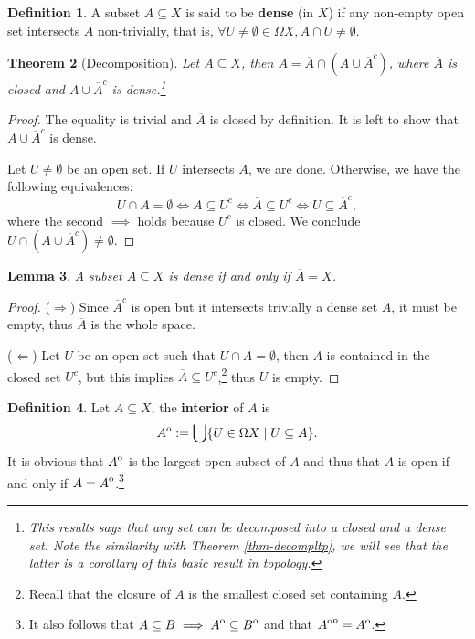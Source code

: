\documentclass{tufte-handout} %
\newtheorem{thm}{Theorem}
\newtheorem{lem}[thm]{Lemma}
\theoremstyle{definition}
\newtheorem{defn}[thm]{Definition}
\theoremstyle{remark}
\newcommand{\0}{\textsf{0}}
\newcommand{\1}{\textsf{1}}
\newcommand{\interior}[1]{
	{\kern0pt#1}^{\mathrm{o}}
}
\begin{document}
\begin{defn}
	A subset $A\subseteq X$ is said to be \textbf{dense} (in $X$) if any non-empty open set intersects $A$ non-trivially, that is, $\forall U \neq \emptyset \in \Omega X, A \cap U \neq \emptyset$.
\end{defn}
\begin{thm}[Decomposition]\label{thm-decomptop}
	Let $A\subseteq X$, then $A = \overline{A} \cap (A \cup \overline{A}^c)$, where $\overline{A}$ is closed and $A \cup \overline{A}^c$ is dense.\footnote{This results says that any set can be decomposed into a closed and a dense set. Note the similarity with Theorem \ref{thm-decompltp}, we will see that the latter is a corollary of this basic result in topology.}
\end{thm}
\begin{proof}
	The equality is trivial and $\overline{A}$ is closed by definition. It is left to show that $A \cup \overline{A}^c$ is dense. 
	
	Let $U \neq \emptyset$ be an open set. If $U$ intersects $A$, we are done. Otherwise, we have the following equivalences:\[U \cap A = \emptyset\Leftrightarrow A \subseteq U^c \Leftrightarrow \overline{A} \subseteq U^c \Leftrightarrow U \subseteq \overline{A}^c,\]
	where the second $\implies$ holds because $U^c$ is closed. We conclude $U \cap (A \cup \overline{A}^c) \neq \emptyset$.
\end{proof}
\begin{lem}
	A subset $A \subseteq X$ is dense if and only if $\overline{A} = X$.
\end{lem}
\begin{proof}
	($\Rightarrow$) Since $\overline{A}^c$ is open but it intersects trivially a dense set $A$, it must be empty, thus $\overline{A}$ is the whole space.
	
	($\Leftarrow$) Let $U$ be an open set such that $U \cap A = \emptyset$, then $A$ is contained in the closed set $U^c$, but this implies $\overline{A} \subseteq U^c$,\footnote{Recall that the closure of $A$ is the smallest closed set containing $A$.} thus $U$ is empty.
\end{proof}
\begin{defn}
	Let $A \subseteq X$, the \textbf{interior} of $A$ is \[\interior{A} := \bigcup \{U \in \Omega X \mid  U\subseteq A\}.\]
	It is obvious that $\interior{A}$ is the largest open subset of $A$ and thus that $A$ is open if and only if $A = \interior{A}$.\footnote{It also follows that $A \subseteq B \implies \interior{A} \subseteq \interior{B}$ and that $\interior{\interior{A}} = \interior{A}$.} 
\end{defn}
\end{document}
